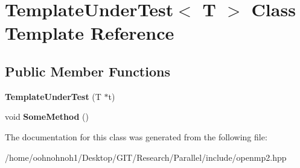 \hypertarget{classTemplateUnderTest}{}\section{Template\+Under\+Test$<$ T $>$ Class Template Reference}
\label{classTemplateUnderTest}
\subsection*{Public Member Functions}
\begin{DoxyCompactItemize}
\item 
\mbox{\label{classTemplateUnderTest_a4d1c3eb00df075511f89ec6e07b431ce}} 
{\bfseries Template\+Under\+Test} (T $\ast$t)
\item 
\mbox{\label{classTemplateUnderTest_a31000e3b4f2738326708ffd1778a4fa1}} 
void {\bfseries Some\+Method} ()
\end{DoxyCompactItemize}


The documentation for this class was generated from the following file\+:\begin{DoxyCompactItemize}
\item 
/home/oohnohnoh1/\+Desktop/\+G\+I\+T/\+Research/\+Parallel/include/openmp2.\+hpp\end{DoxyCompactItemize}
